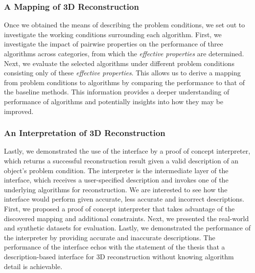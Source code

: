 \subsubsection{A Mapping of 3D Reconstruction}
Once we obtained the means of describing the problem conditions, we set out to investigate the working conditions surrounding each algorithm. First, we investigate the impact of pairwise properties on the performance of three algorithms across categories, from which the \textit{effective properties} are determined. Next, we evaluate the selected algorithms under different problem conditions consisting only of these \textit{effective properties}. This allows us to derive a mapping from problem conditions to algorithms by comparing the performance to that of the baseline methods. This information provides a deeper understanding of performance of algorithms and potentially insights into how they may be improved.

\subsubsection{An Interpretation of 3D Reconstruction}
Lastly, we demonstrated the use of the interface by a proof of concept interpreter, which returns a successful reconstruction result given a valid description of an object's problem condition. The interpreter is the intermediate layer of the interface, which receives a user-specified description and invokes one of the underlying algorithms for reconstruction. We are interested to see how the interface would perform given accurate, less accurate and incorrect descriptions. First, we proposed a proof of concept interpreter that takes advantage of the discovered mapping and additional constraints. Next, we presented the real-world and synthetic datasets for evaluation. Lastly, we demonstrated the performance of the interpreter by providing accurate and inaccurate descriptions. The performance of the interface echos with the statement of the thesis that a description-based interface for 3D reconstruction without knowing algorithm detail is achievable.\\

